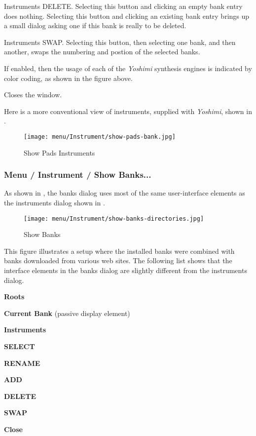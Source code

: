    Instruments DELETE.
   Selecting this button and clicking an empty bank entry does nothing.
   Selecting this button and clicking an existing bank entry brings up a
   small dialog asking one if this bank is really to be deleted.

   Instruments SWAP.
   Selecting this button, then selecting one bank, and then another,
   swaps the numbering and postion of the selected banks.

   If enabled, then the usage of each of the \textsl{Yoshimi} synthesis
   engines is indicated by color coding, as shown in the figure above.

   Closes the window.

   Here is a more conventional view of instruments, supplied with
   \textsl{Yoshimi}, shown in
   .

\begin{figure}[H]
   \centering 
   \texttt{[image: menu/Instrument/show-pads-bank.jpg]}
   \caption[Show Pads Instruments]{Show Pads Instruments}
   \label{fig:show_pads_bank}
\end{figure}

\subsubsection{Menu / Instrument / Show Banks...}
\label{subsubsec:menu_instrument_show_banks}

   As shown in
   ,
   the banks dialog uses most of the same
   user-interface elements as the instruments dialog shown in
   .

\begin{figure}[H]
   \centering 
   \texttt{[image: menu/Instrument/show-banks-directories.jpg]}
   \caption[Show Banks]{Show Banks}
   \label{fig:show_banks_directories}
\end{figure}

   This figure illustrates a setup where the installed banks were combined with
   banks downloaded from various web sites.
   The following list shows that the interface elements in the banks dialog
   are slightly different from the instruments dialog.

   \begin{enumber}
      \item \textbf{Roots}
      \item \textbf{Current Bank} (passive display element)
      \item \textbf{Instruments}
      \item \textbf{SELECT}
      \item \textbf{RENAME}
      \item \textbf{ADD}
      \item \textbf{DELETE}
      \item \textbf{SWAP}
      \item \textbf{Close}
   \end{enumber}

